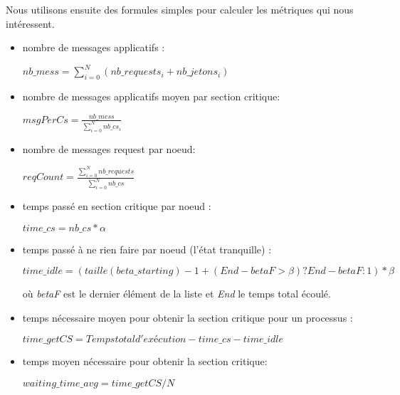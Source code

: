 \documentclass[12pt,a4paper]{article}
\begin{document}
Nous utilisons ensuite des formules simples pour calculer les métriques qui nous intéressent. 
\begin{itemize}
\item nombre de messages applicatifs : 

\hspace{50pt} $nb\_mess = \sum_{i=0}^{N}{(nb\_requests_i + nb\_jetons_i)}$

\item nombre de messages applicatifs moyen par section critique: 

\hspace{50pt} $msgPerCs = \frac{nb\_mess}{\sum_{i=0}^{N}nb\_cs_i}$

\item nombre de messages request par noeud: 

\hspace{50pt} $reqCount = \frac{\sum_{i=0}^Nnb\_requests}{\sum_{i=0}^Nnb\_cs}$

\item temps passé en section critique par noeud : 

\hspace{50pt} $time\_cs = nb\_cs * \alpha$

\item temps passé à ne rien faire par noeud (l'état tranquille) :

\vspace{10pt}
\hspace{-20pt}$time\_idle = ( taille(beta\_starting)-1 + (End-betaF > \beta)?End-betaF:1 ) * \beta$ 

\hspace{-20pt}où \textit{betaF} est le dernier élément de la liste et \textit{End} le temps total écoulé.
\vspace{10pt}

\item temps nécessaire moyen pour obtenir la section critique pour un processus : 

\hspace{50pt}$time\_getCS = Temps total d'exécution - time\_cs - time\_idle$

\item temps moyen nécessaire pour obtenir la section critique: 

\hspace{50pt}$waiting\_time\_avg = time\_getCS / N$

\end{itemize} 
\end{document}

